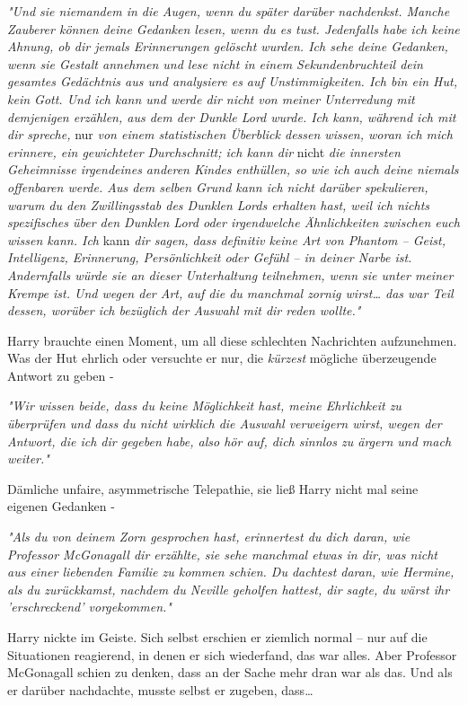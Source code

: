 {\emph{"Und sie niemandem in die Augen, wenn du später darüber nachdenkst. Manche Zauberer können deine Gedanken lesen, wenn du es tust. Jedenfalls habe ich keine Ahnung, ob dir jemals Erinnerungen gelöscht wurden. Ich sehe deine Gedanken, wenn sie Gestalt annehmen und lese nicht in einem Sekundenbruchteil dein gesamtes Gedächtnis aus und analysiere es auf Unstimmigkeiten. Ich bin ein Hut, kein Gott. Und ich kann und werde dir nicht von meiner Unterredung mit demjenigen erzählen, aus dem der Dunkle Lord wurde. Ich kann, während ich mit dir spreche,} nur \emph{von einem statistischen Überblick dessen wissen, woran ich mich erinnere, ein gewichteter Durchschnitt; ich kann dir} nicht \emph{die innersten Geheimnisse irgendeines anderen Kindes enthüllen, so wie ich} \emph{auch deine niemals offenbaren werde. Aus dem selben Grund kann ich nicht darüber spekulieren, warum du den Zwillingsstab des Dunklen Lords erhalten hast, weil ich nichts spezifisches über den Dunklen Lord oder irgendwelche Ähnlichkeiten zwischen euch wissen kann. Ich} kann \emph{dir sagen, dass definitiv keine Art von Phantom -- Geist, Intelligenz, Erinnerung, Persönlichkeit oder Gefühl -- in deiner Narbe ist. Andernfalls würde sie an dieser Unterhaltung teilnehmen, wenn sie unter meiner Krempe ist. Und wegen der Art, auf die du manchmal zornig wirst… das war Teil dessen, worüber ich bezüglich der Auswahl mit dir reden wollte."}

Harry brauchte einen Moment, um all diese schlechten Nachrichten aufzunehmen. Was der Hut ehrlich oder versuchte er nur, die \emph{kürzest} mögliche überzeugende Antwort zu geben -

\emph{"Wir wissen beide, dass du keine Möglichkeit hast, meine Ehrlichkeit zu überprüfen und dass du nicht wirklich die Auswahl verweigern wirst, wegen der Antwort, die ich dir gegeben habe, also hör auf, dich sinnlos zu ärgern und mach weiter."}

Dämliche unfaire, asymmetrische Telepathie, sie ließ Harry nicht mal seine eigenen Gedanken -

\emph{"Als du von deinem Zorn gesprochen hast, erinnertest du dich daran, wie Professor McGonagall dir erzählte, sie sehe manchmal etwas in dir, was nicht aus einer liebenden Familie zu kommen schien. Du dachtest daran, wie Hermine, als du zurückkamst, nachdem du Neville geholfen hattest, dir sagte, du wärst ihr 'erschreckend' vorgekommen."}

Harry nickte im Geiste. Sich selbst erschien er ziemlich normal -- nur auf die Situationen reagierend, in denen er sich wiederfand, das war alles. Aber Professor McGonagall schien zu denken, dass an der Sache mehr dran war als das. Und als er darüber nachdachte, musste selbst er zugeben, dass…

}
